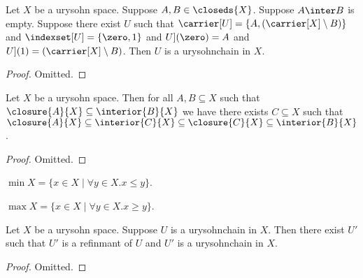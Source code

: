 \begin{proposition}\label{urysohnchain_induction_begin_step_two}
    Let $X$ be a urysohn space.
    Suppose $A,B \in \closeds{X}$.
    Suppose $A \inter B$ is empty.
    Suppose there exist $U$
    such that $\carrier[U] = \{A,(\carrier[X] \setminus B)\}$
    and $\indexset[U]= \{\zero, 1\}$
    and $\index[U](\zero) = A$
    and $\index[U](1) = (\carrier[X] \setminus B)$.
    Then $U$ is a urysohnchain in $X$.
\end{proposition}
\begin{proof}
    Omitted.
\end{proof}



\begin{proposition}\label{t_four_propositon}
    Let $X$ be a urysohn space.
    Then for all $A,B \subseteq X$ such that $\closure{A}{X} \subseteq \interior{B}{X}$
    we have there exists $C \subseteq X$ such that 
    $\closure{A}{X} \subseteq \interior{C}{X} \subseteq \closure{C}{X} \subseteq \interior{B}{X}$.
\end{proposition}
\begin{proof}
    Omitted.
\end{proof}

\begin{definition}\label{minimum}
    $\min{X} = \{x \in X \mid \forall y \in X. x \leq y \}$.
\end{definition}

\begin{definition}\label{maximum}
    $\max{X} = \{x \in X \mid \forall y \in X. x \geq y \}$.
\end{definition}

\begin{proposition}\label{urysohnchain_induction_step_existence}
    Let $X$ be a urysohn space.
    Suppose $U$ is a urysohnchain in $X$.
    Then there exist $U'$ such that $U'$ is a refinmant of $U$ and $U'$ is a urysohnchain in $X$.
\end{proposition}
\begin{proof}

    
    
    Omitted.

\end{proof}



